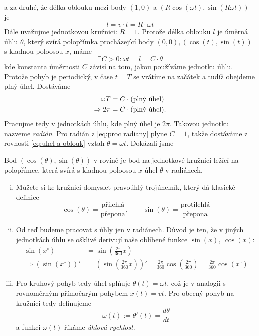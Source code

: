 a za druhé, že délka oblouku mezi body $(1,0)$ a $(R\cos(\omega t),\sin(R\omega t))$ je
\begin{equation*}
  l = v\cdot t = R\cdot \omega t
\end{equation*}
Dále uvažujme jednotkovou kružnici: $R=1$. Protože délka oblouku $l$ je úměrná úhlu $\theta$, který svírá polopřímka procházející body $(0,0),(\cos(t),\sin(t))$ s kladnou poloosou $x$, máme
\begin{equation}\label{eq:uhel a oblouk}
  \exists C>0\colon \omega t = l = C\cdot \theta
\end{equation}
kde konstanta úměrnosti $C$ závisí na tom, jakou používáme jednotku úhlu. Protože pohyb je periodický, v čase $t=T$ se vrátíme na začátek a tudíž obejdeme plný úhel. Dostáváme
\begin{align}
	\omega T &= C\cdot (\text{plný úhel})\notag \\
	\Rightarrow  2\pi &= C\cdot (\text{plný úhel}).\label{eq:proc radiany}
\end{align}
Pracujme tedy v jednotkách úhlu, kde plný úhel je $2\pi.$ Takovou jednotku nazveme \emph{radián}. Pro radián z \ref{eq:proc radiany} plyne $C=1$, takže dostáváme z rovnosti \ref{eq:uhel a oblouk} vztah $\theta = \omega t.$ Dokázali jsme
\begin{věta} Bod $(\cos(\theta),\sin(\theta))$ v rovině je bod na jednotkové kružnici ležící na polopřímce, která svírá s kladnou poloosou $x$ úhel $\theta$ v radiánech. 
\end{věta}
\begin{poznámka}\leavevmode
	\begin{enumerate}[(i)]
	\item Můžete si ke kružnici domyslet pravoúhlý trojúhelník, který dá klasické definice
\begin{equation*}
	\cos(\theta)=\frac{\text{přilehlá}}{\text{přepona}},\qquad\sin(\theta)=\frac{\text{protilehlá}}{\text{přepona}}
\end{equation*}
\item Od teď budeme pracovat s úhly jen v radiánech. Důvod je ten, že v jiných jednotkách úhlu se ošklivě derivují naše oblíbené funkce $\sin(x),\ \cos(x)$:
	\begin{align*}
		\sin(x^\circ)&=\sin\left(\frac{2\pi}{360}x\right) \\
		\Rightarrow (\sin(x^{\circ}))' &= \left(\sin\left(\frac{2\pi}{360}x\right)\right)'=\frac{2\pi}{360}\cos\left(\frac{2\pi}{360}\right)=\frac{2\pi}{360}\cos(x^\circ)
	\end{align*}
\item Pro kruhový pohyb tedy úhel splňuje $\theta(t)=\omega t$, což je v analogii s rovnoměrným přímočarým pohybem $x(t)=v t$. Pro obecný pohyb na kružnici tedy definujeme
\begin{equation*}
  \omega(t) := \theta'(t) = \frac{d\theta}{dt}
\end{equation*}
a funkci $\omega(t)$ říkáme \emph{úhlová rychlost}.
\end{enumerate}
\end{poznámka}

